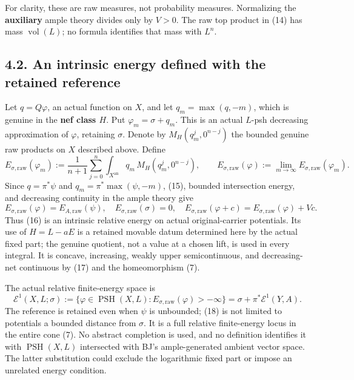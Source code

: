 \documentclass[
  10pt,
]{article}
\begin{document}
For clarity, these are raw measures, not probability measures.
Normalizing the \textbf{auxiliary} ample theory divides only by \(V>0\).
The raw top product in (14) has mass \(\operatorname{vol}(L)\); no
formula identifies that mass with \(L^n\).

\subsection{4.2. An intrinsic energy defined with the retained
reference}\label{an-intrinsic-energy-defined-with-the-retained-reference}

Let \(q=Q\varphi\), an actual function on \(X\), and let
\(q_m=\max(q,-m)\), which is genuine in the \textbf{nef class \(H\)}.
Put \(\varphi_m=\sigma+q_m\). This is an actual \(L\)-psh decreasing
approximation of \(\varphi\), retaining \(\sigma\). Denote by
\(M_H(q_m^j,0^{n-j})\) the bounded genuine raw products on \(X\)
described above. Define \[
 E_{\sigma,\mathrm{raw}}(\varphi_m)
 :=\frac1{n+1}\sum_{j=0}^n
          \int_{X^{\mathrm{an}}}q_m\,M_H(q_m^j,0^{n-j}),
 \qquad
 E_{\sigma,\mathrm{raw}}(\varphi)
 :=\lim_{m\to\infty}E_{\sigma,\mathrm{raw}}(\varphi_m).
 \tag{16}
\] Since \(q=\pi^*\psi\) and \(q_m=\pi^*\max(\psi,-m)\), (15), bounded
intersection energy, and decreasing continuity in the ample theory give
\[
 E_{\sigma,\mathrm{raw}}(\varphi)=E_{A,\mathrm{raw}}(\psi),\quad
 E_{\sigma,\mathrm{raw}}(\sigma)=0,\quad
 E_{\sigma,\mathrm{raw}}(\varphi+c)=E_{\sigma,\mathrm{raw}}(\varphi)+Vc.
 \tag{17}
\] Thus (16) is an intrinsic relative energy on actual original-carrier
potentials. Its use of \(H=L-aE\) is a retained movable datum determined
here by the actual fixed part; the genuine quotient, not a value at a
chosen lift, is used in every integral. It is concave, increasing,
weakly upper semicontinuous, and decreasing-net continuous by (17) and
the homeomorphism (7).

The actual relative finite-energy space is \[
 \mathcal E^1(X,L;\sigma)
 :=\{\varphi\in\operatorname{PSH}(X,L):E_{\sigma,\mathrm{raw}}(\varphi)>-\infty\}
 =\sigma+\pi^*\mathcal E^1(Y,A).
 \tag{18}
\] The reference is retained even when \(\psi\) is unbounded; (18) is
not limited to potentials a bounded distance from \(\sigma\). It is a
full relative finite-energy locus in the entire cone (7). No abstract
completion is used, and no definition identifies it with
\(\operatorname{PSH}(X,L)\) intersected with BJ's ample-generated
ambient vector space. The latter substitution could exclude the
logarithmic fixed part or impose an unrelated energy condition.
\end{document}
